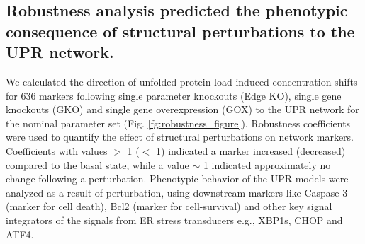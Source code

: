 \documentclass[fleqn,10pt]{wlscirep}
\begin{document}
\subsection*{Robustness analysis predicted the phenotypic consequence of structural perturbations to the UPR network.} We calculated the direction of unfolded protein load induced concentration shifts for 636 markers following single parameter knockouts (Edge KO), single gene knockouts (GKO) and single gene overexpression (GOX) to the UPR network for the nominal parameter set (Fig. \ref{fg:robustness_figure}). Robustness coefficients were used to quantify the effect of structural perturbations on network markers. Coefficients with values $>$ 1 ($<$ 1) indicated a marker increased (decreased) compared to the basal state, while a value $\sim$ 1 indicated approximately no change following a perturbation. Phenotypic behavior of the UPR models were analyzed as a result of perturbation, using downstream markers like Caspase 3 (marker for cell death), Bcl2 (marker for cell-survival) and other key signal integrators of the signals from ER stress transducers e.g., XBP1s, CHOP and ATF4.
\end{document}
